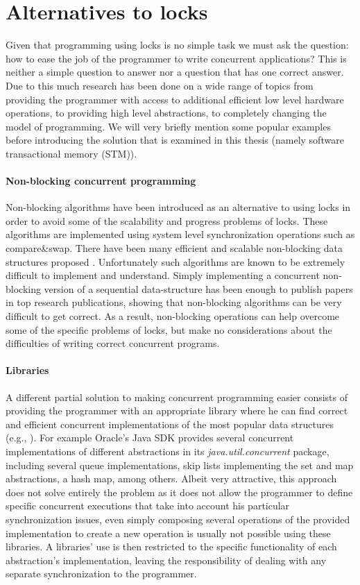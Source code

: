 \section{Alternatives to locks}
Given that programming using locks
is no simple task
we must ask the question:  how to  ease  the  job of  the programmer  to write
concurrent applications?
This is neither a simple question to answer nor a question that has one correct answer.
Due to this much research has been done on a wide range of topics from providing the programmer with access to additional
efficient low level hardware operations, to providing high level abstractions, to completely
changing the model of programming.
We will very briefly mention some popular examples before introducing the solution that is
examined in this thesis (namely software transactional memory (STM)).

\paragraph{Non-blocking concurrent programming}
Non-blocking algorithms \cite{GC96} have been introduced as an alternative to using
locks in order to avoid some of the scalability and progress problems of locks.
These algorithms are implemented using system level synchronization operations such
as compare\&swap.
There have been many efficient and scalable non-blocking data structures proposed
\cite{Mic02,ST04,Val96,FR04,Fra03}.
Unfortunately such algorithms are known to be extremely difficult to implement
and understand.
Simply implementing a concurrent non-blocking version of a sequential data-structure
has been enough to publish papers in top research publications, showing that
non-blocking algorithms can be very difficult to get correct.
As a result, non-blocking operations can help overcome some of the specific problems of locks,
but make no considerations about the difficulties of writing correct concurrent programs.


\paragraph{Libraries}
A different partial  solution to making concurrent programming easier consists of providing 
the programmer with an appropriate 
library where  he  can  find  correct  and  efficient concurrent implementations  of  
the most popular data structures (e.g., \cite{HS08,MS96}). 
For example Oracle's Java SDK \cite{javasdk} provides several concurrent implementations of different abstractions in its
\emph{java.util.concurrent} package, including several queue implementations,
skip lists \cite{Pug90} implementing the set and map abstractions, a hash map, among others.
Albeit very attractive, this approach does not solve entirely the problem  
as it does not allow the programmer to define  specific concurrent executions 
that take into account  his particular  synchronization issues,
even simply composing several operations of the provided implementation
to create a new operation is usually not possible using these libraries.
A libraries' use is then restricted to the specific functionality of each abstraction's implementation,
leaving the responsibility of dealing with any separate synchronization to the programmer.

